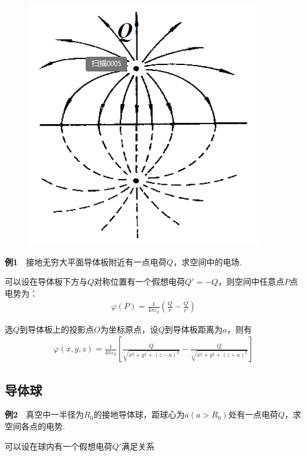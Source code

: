 \documentclass[main.tex]{subfiles}
\begin{document}
\begin{figure}
	\centering
	\includegraphics[width=0.9\linewidth]{jingxiangfa2.png}
\end{figure}

\textbf{例1}\ \ 接地无穷大平面导体板附近有一点电荷$Q$，求空间中的电场.

可以设在导体板下方与$Q$对称位置有一个假想电荷$Q' = -Q$，则空间中任意点$P$点电势为：
\begin{align}
    \varphi(P) = \frac{1}{4\pi \varepsilon _0}\left(\frac{Q}{r} - \frac{Q}{r'} \right)
\end{align}

选$Q$到导体板上的投影点$O$为坐标原点，设$Q$到导体板距离为$a$，则有
\begin{align}
    \varphi (x,y,z) = \frac{1}{4\pi \varepsilon _0}\left[\frac{Q}{\sqrt{x^2+y^2+(z-a)^2}} - \frac{Q}{\sqrt{x^2+y^2+(z+a)^2}} \right]
\end{align}


\subsection{导体球}
\textbf{例2}\ \ 真空中一半径为$R_0$的接地导体球，距球心为$a(a>R_0)$处有一点电荷$Q$，求空间各点的电势.

\begin{figure}[H]
  \centering
  \subfigure{
    }
  \hspace{0.5in} %
  \subfigure{
    }
\end{figure}
可以设在球内有一个假想电荷$Q'$满足关系
\end{document}
